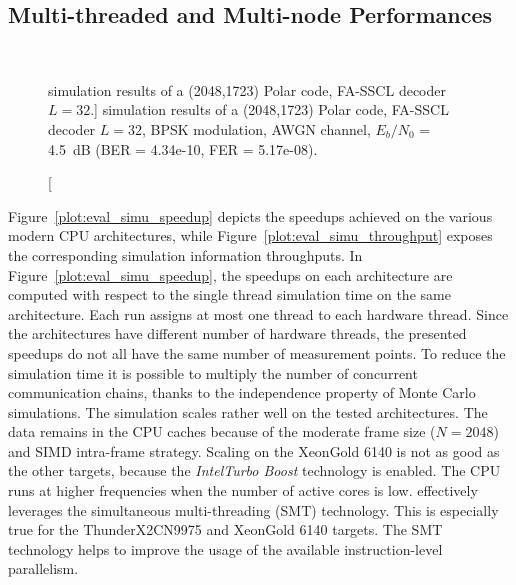 \subsection{Multi-threaded and Multi-node Performances}
\label{sec:eval_simu_mt}

\begin{figure}[htp]
  \centering
  \\
  \caption
    [\AFFECT simulation results of a (2048,1723) Polar code, FA-SSCL decoder
     $L=32$.]
    {\AFFECT simulation results of a (2048,1723) Polar code, FA-SSCL decoder
     $L=32$, BPSK modulation, AWGN channel, $E_b/N_0$ = 4.5~dB (BER = 4.34e-10,
     FER = 5.17e-08).}
  \label{plot:eval_simu_speedup_throughput}
\end{figure}

Figure~\ref{plot:eval_simu_speedup} depicts the speedups achieved on the various
modern CPU architectures, while Figure~\ref{plot:eval_simu_throughput} exposes
the corresponding simulation information throughputs. In
Figure~\ref{plot:eval_simu_speedup}, the speedups on each architecture are
computed with respect to the single thread simulation time on the same
architecture. Each run assigns at most one \AFFECT thread to each hardware
thread. Since the architectures have different number of hardware threads, the
presented speedups do not all have the same number of measurement points. To
reduce the simulation time it is possible to multiply the number of concurrent
communication chains, thanks to the independence property of Monte Carlo
simulations. The simulation scales rather well on the tested architectures. The
data remains in the CPU caches because of the moderate frame size ($N = 2048$)
and SIMD intra-frame strategy. Scaling on the Xeon\TM Gold 6140 is not as good
as the other targets, because the \textit{Intel\R Turbo Boost} technology is
enabled. The CPU runs at higher frequencies when the number of active cores is
low. \AFFECT effectively leverages the simultaneous multi-threading (SMT)
technology. This is especially true for the ThunderX2\R CN9975 and Xeon\TM Gold
6140 targets. The SMT technology helps to improve the usage of the available
instruction-level parallelism.

